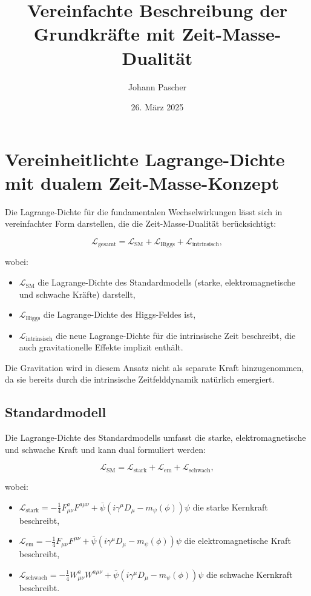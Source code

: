 \documentclass{article}
\title{Vereinfachte Beschreibung der Grundkräfte mit Zeit-Masse-Dualität}
\author{Johann Pascher}
\date{26. März 2025}
\begin{document}
	\maketitle
	
	\tableofcontents
	\newpage
	
	\section{Vereinheitlichte Lagrange-Dichte mit dualem Zeit-Masse-Konzept}
	
	Die Lagrange-Dichte für die fundamentalen Wechselwirkungen lässt sich in vereinfachter Form darstellen, die die Zeit-Masse-Dualität berücksichtigt:
	
	\begin{equation}
		\mathcal{L}_\text{gesamt} = \mathcal{L}_\text{SM} + \mathcal{L}_\text{Higgs} + \mathcal{L}_\text{intrinsisch},
	\end{equation}
	
	wobei:
	\begin{itemize}
		\item $\mathcal{L}_\text{SM}$ die Lagrange-Dichte des Standardmodells (starke, elektromagnetische und schwache Kräfte) darstellt,
		\item $\mathcal{L}_\text{Higgs}$ die Lagrange-Dichte des Higgs-Feldes ist,
		\item $\mathcal{L}_\text{intrinsisch}$ die neue Lagrange-Dichte für die intrinsische Zeit beschreibt, die auch gravitationelle Effekte implizit enthält.
	\end{itemize}
	
	Die Gravitation wird in diesem Ansatz nicht als separate Kraft hinzugenommen, da sie bereits durch die intrinsische Zeitfelddynamik natürlich emergiert.
	
	\subsection{Standardmodell}
	Die Lagrange-Dichte des Standardmodells umfasst die starke, elektromagnetische und schwache Kraft und kann dual formuliert werden:
	
	\begin{equation}
		\mathcal{L}_\text{SM} = \mathcal{L}_\text{stark} + \mathcal{L}_\text{em} + \mathcal{L}_\text{schwach},
	\end{equation}
	
	wobei:
	\begin{itemize}
		\item $\mathcal{L}_\text{stark} = -\frac{1}{4} F_{\mu\nu}^a F^{a\mu\nu} + \bar{\psi}(i \gamma^\mu D_\mu - m_\psi(\phi))\psi$ die starke Kernkraft beschreibt,
		\item $\mathcal{L}_\text{em} = -\frac{1}{4} F_{\mu\nu} F^{\mu\nu} + \bar{\psi}(i \gamma^\mu D_\mu - m_\psi(\phi))\psi$ die elektromagnetische Kraft beschreibt,
		\item $\mathcal{L}_\text{schwach} = -\frac{1}{4} W_{\mu\nu}^a W^{a\mu\nu} + \bar{\psi}(i \gamma^\mu D_\mu - m_\psi(\phi))\psi$ die schwache Kernkraft beschreibt.
	\end{itemize}
	
\end{document}

